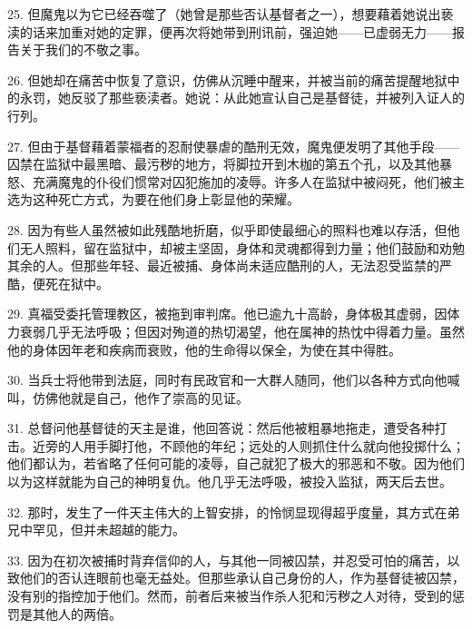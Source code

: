 25. 但魔鬼以为它已经吞噬了（她曾是那些否认基督者之一），想要藉着她说出亵渎的话来加重对她的定罪，便再次将她带到刑讯前，强迫她——已虚弱无力——报告关于我们的不敬之事。\par

26. 但她却在痛苦中恢复了意识，仿佛从沉睡中醒来，并被当前的痛苦提醒地狱中的永罚，她反驳了那些亵渎者。她说：从此她宣认自己是基督徒，并被列入证人的行列。\par

27. 但由于基督藉着蒙福者的忍耐使暴虐的酷刑无效，魔鬼便发明了其他手段——囚禁在监狱中最黑暗、最污秽的地方，将脚拉开到木枷的第五个孔，以及其他暴怒、充满魔鬼的仆役们惯常对囚犯施加的凌辱。许多人在监狱中被闷死，他们被主选为这种死亡方式，为要在他们身上彰显他的荣耀。\par

28. 因为有些人虽然被如此残酷地折磨，似乎即使最细心的照料也难以存活，但他们无人照料，留在监狱中，却被主坚固，身体和灵魂都得到力量；他们鼓励和劝勉其余的人。但那些年轻、最近被捕、身体尚未适应酷刑的人，无法忍受监禁的严酷，便死在狱中。\par

29. 真福受委托管理教区，被拖到审判席。他已逾九十高龄，身体极其虚弱，因体力衰弱几乎无法呼吸；但因对殉道的热切渴望，他在属神的热忱中得着力量。虽然他的身体因年老和疾病而衰败，他的生命得以保全，为使在其中得胜。\par

30. 当兵士将他带到法庭，同时有民政官和一大群人随同，他们以各种方式向他喊叫，仿佛他就是自己，他作了崇高的见证。\par

31. 总督问他基督徒的天主是谁，他回答说：然后他被粗暴地拖走，遭受各种打击。近旁的人用手脚打他，不顾他的年纪；远处的人则抓住什么就向他投掷什么；他们都认为，若省略了任何可能的凌辱，自己就犯了极大的邪恶和不敬。因为他们以为这样就能为自己的神明复仇。他几乎无法呼吸，被投入监狱，两天后去世。\par

32. 那时，发生了一件天主伟大的上智安排，的怜悯显现得超乎度量，其方式在弟兄中罕见，但并未超越的能力。\par

33. 因为在初次被捕时背弃信仰的人，与其他一同被囚禁，并忍受可怕的痛苦，以致他们的否认连眼前也毫无益处。但那些承认自己身份的人，作为基督徒被囚禁，没有别的指控加于他们。然而，前者后来被当作杀人犯和污秽之人对待，受到的惩罚是其他人的两倍。\par

